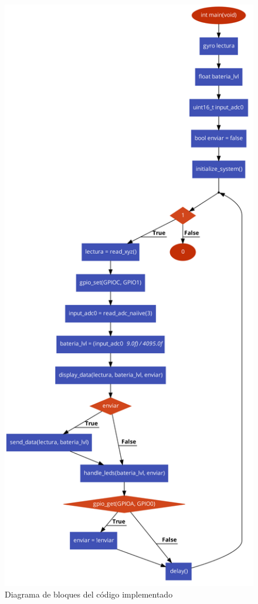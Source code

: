 \begin{figure}[H]
    \centering
    \includegraphics[scale=0.25]{images/Bloques.png}
    \caption{Diagrama de bloques del código implementado}
    \label{fig:circuito}
\end{figure}

